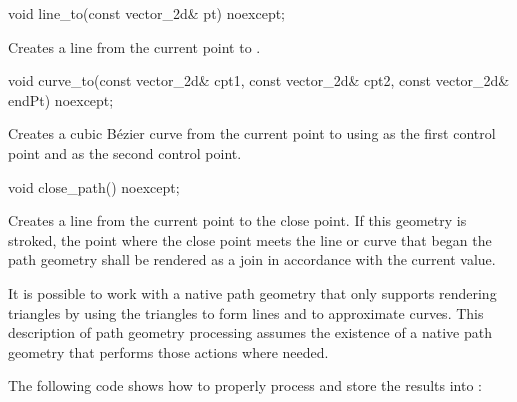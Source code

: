 \begin{itemdecl}
  void line_to(const vector_2d& pt) noexcept;
\end{itemdecl}
\begin{itemdescr}
	\pnum
	\effects
	Creates a line from the current point to .

\end{itemdescr}

\begin{itemdecl}
  void curve_to(const vector_2d& cpt1, const vector_2d& cpt2,
    const vector_2d& endPt) noexcept;
\end{itemdecl}
\begin{itemdescr}
	\pnum
	\effects
	Creates a cubic B\'ezier curve from the current point to  using  as the first control point and  as the second control point.

\end{itemdescr}

\begin{itemdecl}
  void close_path() noexcept;
\end{itemdecl}
\begin{itemdescr}
	\pnum
	\effects
	Creates a line from the current point to the close point. If this geometry is stroked, the point where the close point meets the line or curve that began the path geometry shall be rendered as a join in accordance with the current  value.

\end{itemdescr}

\pnum
\enternote
It is possible to work with a native path geometry that only supports rendering triangles by using the triangles to form lines and to approximate curves. This description of path geometry processing assumes the existence of a native path geometry that performs those actions where needed.
\exitnote

\pnum
The following code shows how to properly process  and store the results into :

